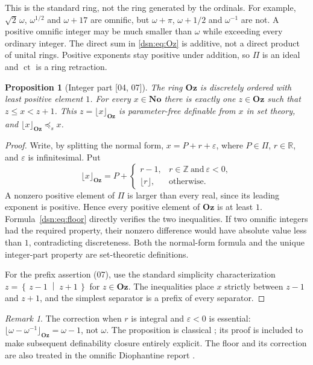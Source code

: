 \documentclass[11pt,a4paper]{article}
\numberwithin{equation}{section}
\newtheorem{proposition}[proposition]{Proposition}
\theoremstyle{definition}
\theoremstyle{remark}
\newtheorem{remark}[remark]{Remark}
\newcommand{\No}{\mathbf{No}}
\newcommand{\Oz}{\mathbf{Oz}}
\newcommand{\Z}{\mathbb Z}
\newcommand{\R}{\mathbb R}
\newcommand{\ct}{\operatorname{ct}}
\newcommand{\pseq}{\mathrel{\preceq_s}}
\newcommand{\cut}[2]{\left\{\,#1\;\middle|\;#2\,\right\}}
\newcommand{\src}[1]{\textup{\textsf{\small[#1]}}}
\begin{document}
This is the standard ring, not the ring generated by the ordinals.
For example, $\sqrt2\,\omega$, $\omega^{1/2}$ and $\omega+17$ are omnific,
but $\omega+\pi$, $\omega+1/2$ and $\omega^{-1}$ are not. A positive
omnific integer may be much smaller than $\omega$ while exceeding every
ordinary integer. The direct sum in \eqref{dsn:eq:Oz} is additive, not a
direct product of unital rings. Positive exponents stay positive under
addition, so $\Pi$ is an ideal and $\ct$ is a ring retraction.

\begin{proposition}[Integer part \src{04, 07}]\label{dsn:prop:floor}
The ring $\Oz$ is discretely ordered with least positive element $1$.
For every $x\in\No$ there is exactly one $z\in\Oz$ such that
$z\leq x<z+1$. This $z=\lfloor x\rfloor_{\Oz}$ is parameter-free
definable from $x$ in set theory, and $\lfloor x\rfloor_{\Oz}\pseq x$.
\end{proposition}
\begin{proof}
Write, by splitting the normal form,
$x=P+r+\varepsilon$, where $P\in\Pi$, $r\in\R$, and
$\varepsilon$ is infinitesimal. Put
\begin{equation}\label{dsn:eq:floor}
 \lfloor x\rfloor_{\Oz}=P+
 \begin{cases}
 r-1,&r\in\Z\ \text{and}\ \varepsilon<0,\\
 \lfloor r\rfloor,&\text{otherwise}.
 \end{cases}
\end{equation}
A nonzero positive element of $\Pi$ is larger than every real, since
its leading exponent is positive. Hence every positive element of
$\Oz$ is at least $1$. Formula~\eqref{dsn:eq:floor} directly verifies the
two inequalities. If two omnific integers had the required property,
their nonzero difference would have absolute value less than $1$,
contradicting discreteness. Both the normal-form formula and the unique
integer-part property are set-theoretic definitions.

For the prefix assertion (07), use the standard simplicity
characterization $z=\cut{z-1}{z+1}$ for $z\in\Oz$. The inequalities place
$x$ strictly between $z-1$ and $z+1$, and the simplest separator is a
prefix of every separator.
\end{proof}

\begin{remark}
The correction when $r$ is integral and $\varepsilon<0$ is essential:
$\lfloor\omega-\omega^{-1}\rfloor_{\Oz}=\omega-1$, not $\omega$.
The proposition is classical \cite{Conway,LM}; its proof is included
to make subsequent definability closure entirely explicit. The floor and
its correction are also treated in the omnific Diophantine report
\cite{RepoOdg}.
\end{remark}
\end{document}
